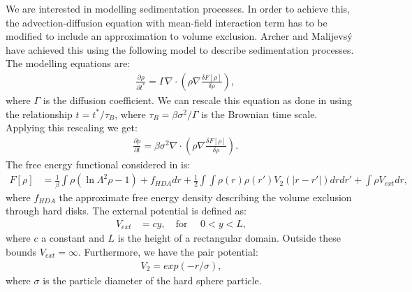 We are interested in modelling sedimentation processes. In order to achieve this, the advection-diffusion equation with mean-field interaction term has to be modified to include an approximation to volume exclusion. Archer and Malijevs\'y \cite{ArcherSed1} have achieved this using the following model to describe sedimentation processes. 
The modelling equations are:
\begin{align*}
	&\frac{\partial \rho}{\partial t^*} = \Gamma\nabla \cdot \left(  \rho \nabla \frac{\delta F[\rho]}{\delta \rho} \right) ,
\end{align*}
where $\Gamma$ is the diffusion coefficient. 	
We can rescale this equation as done in \cite{ArcherSed1} using the relationship $t = t^*/ \tau_B$, where $\tau_B = \beta \sigma^2 / \Gamma$ is the Brownian time scale.
Applying this rescaling we get:
\begin{align}\label{Eq1}
	&\frac{\partial \rho}{\partial t} = \beta \sigma^2\nabla \cdot \left(  \rho \nabla \frac{\delta F[\rho]}{\delta \rho} \right).
\end{align}
The free energy functional considered in \cite{ArcherSed1} is:
\begin{align*}
	F[\rho] &= \frac{1}{\beta} \int \rho (\ln \Lambda^2 \rho - 1) + f_{HDA} dr + \frac{1}{2}\int \int \rho(r) \rho(r') V_2(|r - r'|) dr dr' + \int \rho V_{ext} dr,
\end{align*}
where $f_{HDA}$ the approximate free energy density describing the volume exclusion through hard disks. The external potential is defined as:
\begin{align*}
	V_{ext} &= c y, \quad \text{for } \quad 0 < y < L,
\end{align*}
where $c$ a constant and $L$ is the height of a rectangular domain. Outside these bounds $V_{ext} = \infty$. 
Furthermore, we have the pair potential:
\begin{align*}
	V_2 = exp(-r/\sigma),
\end{align*}
where $\sigma$ is the particle diameter of the hard sphere particle.



